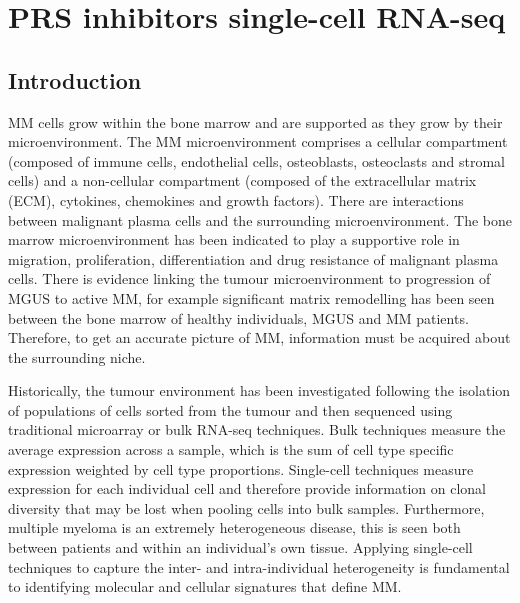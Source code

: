 \chapter{\label{ch:6-sc}PRS inhibitors single-cell RNA-seq}


\section{Introduction}
MM cells grow within the bone marrow and are supported as they grow by their microenvironment.
The MM microenvironment comprises a cellular compartment (composed of immune cells, endothelial cells, osteoblasts, osteoclasts and stromal cells) and a non-cellular compartment (composed of the extracellular matrix (ECM), cytokines, chemokines and growth factors)\cite{manier2012bone, kawano2015targeting}.
There are interactions between malignant plasma cells and the surrounding microenvironment.
The bone marrow microenvironment has been indicated to play a supportive role in migration, proliferation, differentiation and drug resistance of malignant plasma cells.
There is evidence linking the tumour microenvironment to progression of MGUS to active MM, for example significant matrix remodelling has been seen between the bone marrow of healthy individuals, MGUS and MM patients\cite{kawano2015targeting}.
Therefore, to get an accurate picture of MM, information must be acquired about the surrounding niche.

Historically, the tumour environment has been investigated following the isolation of populations of cells sorted from the tumour and then sequenced using traditional microarray or bulk RNA-seq techniques.
Bulk techniques measure the average expression across a sample, which is the sum of cell type specific expression weighted by cell type proportions.
Single-cell techniques measure expression for each individual cell and therefore provide information on clonal diversity that may be lost when pooling cells into bulk samples.
Furthermore, multiple myeloma is an extremely heterogeneous disease, this is seen both between patients and within an individual’s own tissue.
Applying single-cell techniques to capture the inter- and intra-individual heterogeneity is fundamental to identifying molecular and cellular signatures that define MM\@.


